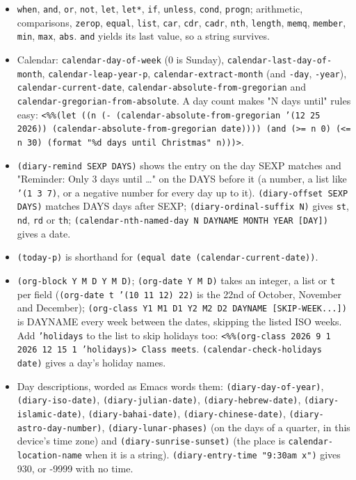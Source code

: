 \documentclass[11pt]{article}
\begin{document}
\begin{itemize}
\item \texttt{when}, \texttt{and}, \texttt{or}, \texttt{not}, \texttt{let}, \texttt{let*}, \texttt{if}, \texttt{unless}, \texttt{cond}, \texttt{progn}; arithmetic, comparisons, \texttt{zerop}, \texttt{equal}, \texttt{list}, \texttt{car}, \texttt{cdr}, \texttt{cadr}, \texttt{nth}, \texttt{length}, \texttt{memq}, \texttt{member}, \texttt{min}, \texttt{max}, \texttt{abs}. \texttt{and} yields its last value, so a string survives.
\item Calendar: \texttt{calendar-day-of-week} (0 is Sunday), \texttt{calendar-last-day-of-month}, \texttt{calendar-leap-year-p}, \texttt{calendar-extract-month} (and \texttt{-day}, \texttt{-year}), \texttt{calendar-current-date}, \texttt{calendar-absolute-from-gregorian} and \texttt{calendar-gregorian-from-absolute}. A day count makes "N days until" rules easy: \texttt{<\%\%(let ((n (- (calendar-absolute-from-gregorian '(12 25 2026)) (calendar-absolute-from-gregorian date)))) (and (>= n 0) (<= n 30) (format "\%d days until Christmas" n)))>}.
\item \texttt{(diary-remind SEXP DAYS)} shows the entry on the day SEXP matches and "Reminder: Only 3 days until \ldots{}" on the DAYS before it (a number, a list like \texttt{'(1 3 7)}, or a negative number for every day up to it). \texttt{(diary-offset SEXP DAYS)} matches DAYS days after SEXP; \texttt{(diary-ordinal-suffix N)} gives \texttt{st}, \texttt{nd}, \texttt{rd} or \texttt{th}; \texttt{(calendar-nth-named-day N DAYNAME MONTH YEAR [DAY])} gives a date.
\item \texttt{(today-p)} is shorthand for \texttt{(equal date (calendar-current-date))}.
\item \texttt{(org-block Y M D Y M D)}; \texttt{(org-date Y M D)} takes an integer, a list or \texttt{t} per field (\texttt{(org-date t '(10 11 12) 22)} is the 22nd of October, November and December); \texttt{(org-class Y1 M1 D1 Y2 M2 D2 DAYNAME [SKIP-WEEK...])} is DAYNAME every week between the dates, skipping the listed ISO weeks. Add \texttt{'holidays} to the list to skip holidays too: \texttt{<\%\%(org-class 2026 9 1 2026 12 15 1 'holidays)> Class meets}. \texttt{(calendar-check-holidays date)} gives a day's holiday names.
\item Day descriptions, worded as Emacs words them: \texttt{(diary-day-of-year)}, \texttt{(diary-iso-date)}, \texttt{(diary-julian-date)}, \texttt{(diary-hebrew-date)}, \texttt{(diary-islamic-date)}, \texttt{(diary-bahai-date)}, \texttt{(diary-chinese-date)}, \texttt{(diary-astro-day-number)}, \texttt{(diary-lunar-phases)} (on the days of a quarter, in this device's time zone) and \texttt{(diary-sunrise-sunset)} (the place is \texttt{calendar-location-name} when it is a string). \texttt{(diary-entry-time "9:30am x")} gives 930, or -9999 with no time.

\end{itemize}
\end{document}
